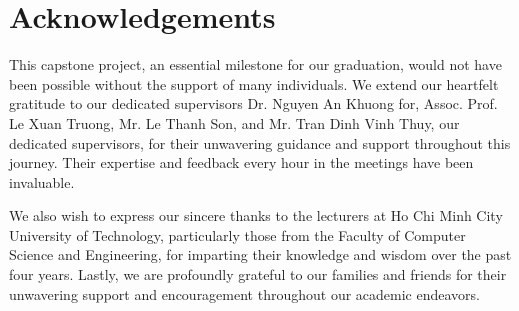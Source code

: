 \chapter*{Acknowledgements}

This capstone project, an essential milestone for our graduation, would not have been possible without the support of many individuals. We extend our heartfelt gratitude to our dedicated supervisors Dr. Nguyen An Khuong for, Assoc. Prof. Le Xuan Truong, Mr. Le Thanh Son, and Mr. Tran Dinh Vinh Thuy, our dedicated supervisors, for their unwavering guidance and support throughout this journey. Their expertise and feedback every hour in the meetings have been invaluable.

We also wish to express our sincere thanks to the lecturers at Ho Chi Minh City University of Technology, particularly those from the Faculty of Computer Science and Engineering, for imparting their knowledge and wisdom over the past four years. Lastly, we are profoundly grateful to our families and friends for their unwavering support and encouragement throughout our academic endeavors.